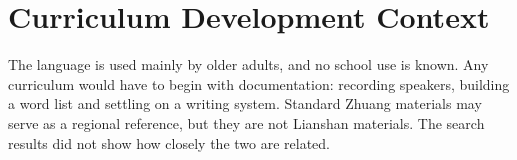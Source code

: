 \documentclass[12pt]{article}
\begin{document}
\section{Curriculum Development Context}
The language is used mainly by older adults, and no school use is known. Any curriculum would have to begin with documentation: recording speakers, building a word list and settling on a writing system. Standard Zhuang materials may serve as a regional reference, but they are not Lianshan materials. The search results did not show how closely the two are related.
\end{document}
